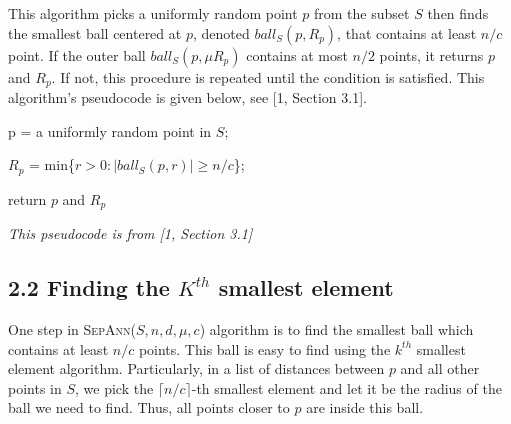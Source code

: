 \documentclass[12pt,english,]{article}
\let\origfigure\figure
\let\endorigfigure\endfigure
\renewenvironment{figure}[1][2] {
    \expandafter\origfigure\expandafter[H]
} {
    \endorigfigure
}
\begin{document}
This algorithm picks a uniformly random point \(p\) from the subset
\(S\) then finds the smallest ball centered at \(p\), denoted
\(ball_S(p, R_p)\), that contains at least \(n/c\) point. If the outer
ball \(ball_S(p,\mu R_p)\) contains at most \(n/2\) points, it returns
\(p\) and \(R_p\). If not, this procedure is repeated until the
condition is satisfied. This algorithm's pseudocode is given below, see
{[}1, Section 3.1{]}.

\begin{figure}[ht]
  \centering
  \begin{minipage}{0.9\linewidth}
    {\LinesNotNumbered
    \begin{algorithm}[H]
    \DontPrintSemicolon
    \SetAlgoLined
    \BlankLine
    \centering
    \begin{minipage}{.80\linewidth}
      {p = a uniformly random point in $S$;

      $R_p$ = min\{$r > 0: |ball_S(p, r)| \geq n/c$\};}
      return $p$ and $R_p$
    \end{minipage}
    \caption{\textsc{SparseSepAnn}$(S,n,d,t)$}
    \end{algorithm}}
  \end{minipage}
  \begin{minipage}{0.90\textwidth}
    \begin{flushright}
    {\footnotesize \emph{This pseudocode is from [1, Section 3.1]}\par}
    \end{flushright}
  \end{minipage}
\end{figure}

\hypertarget{section2.2}{%
\subsection{\texorpdfstring{2.2 \enspace Finding the \(K^{th}\) smallest
element}{2.2 Finding the K\^{}\{th\} smallest element}}\label{section2.2}}

One step in \textsc{SepAnn($S,n,d,\mu,c$)} algorithm is to find the
smallest ball which contains at least \(n/c\) points. This ball is easy
to find using the \(k^{th}\) smallest element algorithm. Particularly,
in a list of distances between \(p\) and all other points in \(S\), we
pick the \(\lceil n/c\rceil\)-th smallest element and let it be the
radius of the ball we need to find. Thus, all points closer to \(p\) are
inside this ball.
\end{document}
